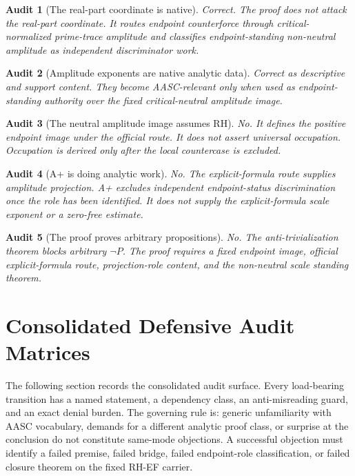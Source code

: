 \documentclass[11pt]{article}
\newtheorem{audit}{Audit}[section]
\begin{document}
\begin{audit}[The real-part coordinate is native]
Correct.  The proof does not attack the real-part coordinate.  It routes endpoint counterforce through critical-normalized prime-trace amplitude and classifies endpoint-standing non-neutral amplitude as independent discriminator work.
\end{audit}

\begin{audit}[Amplitude exponents are native analytic data]
Correct as descriptive and support content.  They become AASC-relevant only when used as endpoint-standing authority over the fixed critical-neutral amplitude image.
\end{audit}

\begin{audit}[The neutral amplitude image assumes RH]
No.  It defines the positive endpoint image under the official route.  It does not assert universal occupation.  Occupation is derived only after the local countercase is excluded.
\end{audit}

\begin{audit}[A+ is doing analytic work]
No.  The explicit-formula route supplies amplitude projection.  A+ excludes independent endpoint-status discrimination once the role has been identified.  It does not supply the explicit-formula scale exponent or a zero-free estimate.
\end{audit}

\begin{audit}[The proof proves arbitrary propositions]
No.  The anti-trivialization theorem blocks arbitrary \(\neg P\).  The proof requires a fixed endpoint image, official explicit-formula route, projection-role content, and the non-neutral scale standing theorem.
\end{audit}


\section{Consolidated Defensive Audit Matrices}

The following section records the consolidated audit surface.  Every load-bearing transition has a named statement, a dependency class, an anti-misreading guard, and an exact denial burden.  The governing rule is: generic unfamiliarity with AASC vocabulary, demands for a different analytic proof class, or surprise at the conclusion do not constitute same-mode objections.  A successful objection must identify a failed premise, failed bridge, failed endpoint-role classification, or failed closure theorem on the fixed RH-EF carrier.
\end{document}
